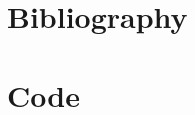 \documentclass[a4paper,11pt,spanish]{report}
\begin{document}

\chapter*{Bibliography}
\label{chap:bib}

\nocite{*}

% 


\chapter*{Code}
\label{chap:code}


\end{document}
